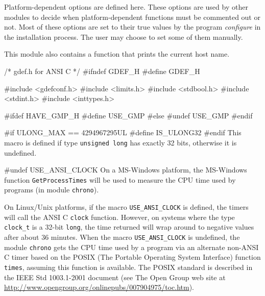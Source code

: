 
Platform-dependent options are defined here.
These options are used by other modules to decide when
platform-dependent functions must be commented out or not.
Most of these options are set to their true values by the program
{\it configure} in the installation process. The user may choose
to set some of them manually.
\iffalse
Each option must either be left undefined (i.e., the corresponding
macro is put to false, using ``\texttt{\#undef})
or can be given its proper value (using ``\texttt{\#define} commands).
An option can be defined only under certain conditions.
For example, \texttt{USE\_GMP} can be defined only if GMP
is available, \texttt{HAVE\_ERF} can be defined only if the Unix \texttt{erf}
function is available, and so on.
\fi
This module also contains a function that prints the current host name.

\code\hide
/* gdef.h  for ANSI C */
#ifndef GDEF_H
#define GDEF_H

#include <gdefconf.h>
#include <limits.h>
#include <stdbool.h>
#include <stdint.h>
#include <inttypes.h>

#ifdef HAVE_GMP_H
#define USE_GMP
#else
#undef USE_GMP
#endif
\endhide
\endcode


\hide
\code


#if ULONG_MAX == 4294967295UL
#define IS_ULONG32
#endif
\endcode
  \tab This macro is defined if type \texttt {unsigned long} has
  exactly 32 bits, otherwise it is undefined.
 \endtab
\endhide
\code


#undef USE_ANSI_CLOCK
\endcode
  \tab On a MS-Windows platform,
  the MS-Windows function \texttt{GetProcessTimes} will be used to measure
  the CPU time used by programs (in module \texttt{chrono}).

  On Linux/Unix platforms, if the macro
  \texttt{USE\_ANSI\_CLOCK} is defined, the timers %
  will call the ANSI C  \texttt{clock} function. However, on systems
  where the type \texttt{clock\_t} is a 32-bit \texttt{long},
  the time returned
  will wrap around to negative values after about 36 minutes.
  When the macro \texttt{USE\_ANSI\_CLOCK} is undefined, the
  module \texttt{chrono} gets the CPU time used by a program via an
  alternate non-ANSI C timer
  based on the POSIX (The Portable Operating System Interface)
  function \texttt{times}, assuming this function is available. The POSIX
  standard is described in the IEEE Std 1003.1-2001 document (see
  The Open Group web site at
  \url{http://www.opengroup.org/onlinepubs/007904975/toc.htm}).
 \endtab
\code


